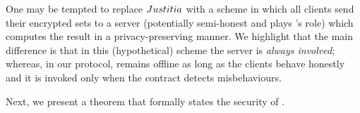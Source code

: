\begin{enumerate}
 
 
 
 
  \end{enumerate}
 
 
 
 
 
 

One may be tempted to replace ${Justitia}$ with a scheme in which all clients send their encrypted sets to a server (potentially semi-honest and plays \aud's role) which computes the result in a privacy-preserving manner.  We highlight that the main difference is that in this (hypothetical) scheme the server is \emph{always involved};  whereas, in our protocol, \aud remains offline as long as the clients behave honestly and it is invoked only when the contract detects misbehaviours.  
 
 
 Next, we present a theorem that formally states the security of \fpsi. 
 
